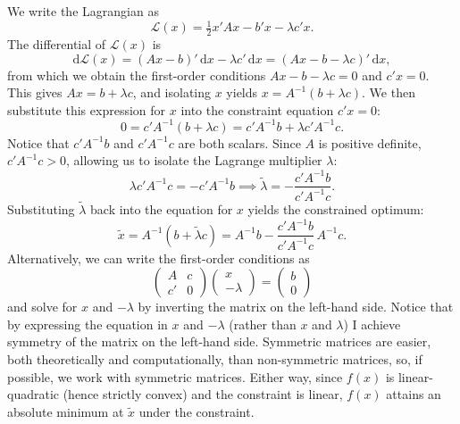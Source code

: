 \documentclass[12pt,a4paper]{article}
\makeatletter
\theoremstyle{definition}
\renewenvironment{proof}[1][\proofname]{\par
  \pushQED{\qed}%
  \normalfont \topsep6\p@\@plus6\p@\relax
  \trivlist
  \item[\hskip\labelsep\bfseries #1\@addpunct{.}]\ignorespaces
}{%
  \popQED\endtrivlist\@endpefalse
}
\newenvironment{solution}{%
  \begin{proof}[Solution]%
}{%
  \end{proof}%
}
\newcommand{\dd}{\mathrm{d}}
\makeatother
\begin{document}
\begin{solution}
We write the Lagrangian as
\[
\mathcal{L}(x) = \tfrac{1}{2} x'Ax - b'x - \lambda c'x.
\]
The differential of $\mathcal{L}(x)$ is
\[
\dd\mathcal{L}(x) = (Ax - b)'\, \dd x - \lambda c'\, \dd x = (Ax - b - \lambda c)'\, \dd x,
\]
from which we obtain the first-order conditions $Ax - b - \lambda c = 0$ and $c'x = 0$. %
This gives $Ax = b + \lambda c$, and isolating $x$ yields $x = A^{-1}(b + \lambda c)$.
We then substitute this expression for $x$ into the constraint equation $c'x = 0$:
\[
0 = c'A^{-1}(b + \lambda c) = c'A^{-1}b + \lambda c'A^{-1}c.
\]
Notice that $c'A^{-1}b$ and $c'A^{-1}c$ are both scalars. Since $A$ is positive definite, $c'A^{-1}c > 0$, allowing us to isolate the Lagrange multiplier $\lambda$:
\[
\lambda c'A^{-1}c = -c'A^{-1}b \implies \tilde{\lambda} = -\frac{c'A^{-1}b}{c'A^{-1}c}.
\]
Substituting $\tilde{\lambda}$ back into the equation for $x$ yields the constrained optimum:
\[
\tilde{x} = A^{-1}(b + \tilde{\lambda} c) = A^{-1}b - \frac{c'A^{-1}b}{c'A^{-1}c}\, A^{-1}c.
\]
Alternatively, we can write the first-order conditions as
\[
\begin{pmatrix} A & c \\ c' & 0 \end{pmatrix}
\begin{pmatrix} x \\ -\lambda \end{pmatrix}
= \begin{pmatrix} b \\ 0 \end{pmatrix}
\]
and solve for $x$ and $-\lambda$ by inverting the matrix on the left-hand side. Notice that by expressing the equation in $x$ and $-\lambda$ (rather than $x$ and $\lambda$) I achieve symmetry of the matrix on the left-hand side. Symmetric matrices are easier, both theoretically and computationally, than non-symmetric matrices, so, if possible, we work with symmetric matrices. %
Either way, since $f(x)$ is linear-quadratic (hence strictly convex) and the constraint is linear, $f(x)$ attains an absolute minimum at $\tilde{x}$ under the constraint. %
\end{solution}
\end{document}

